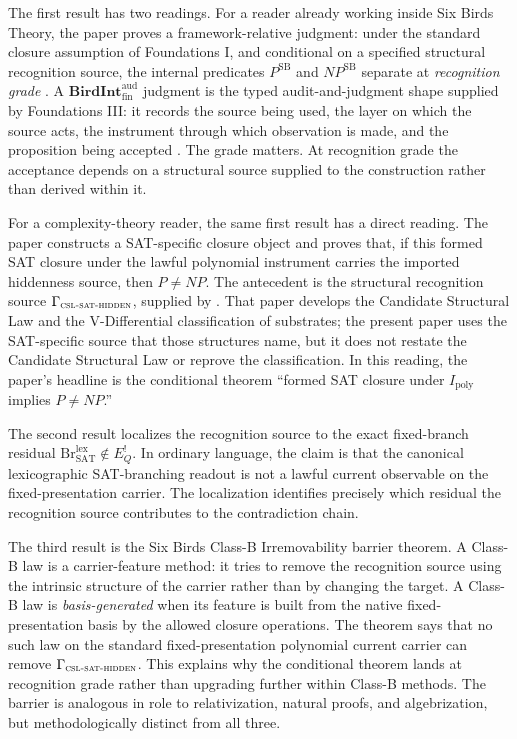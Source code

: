 \documentclass[11pt]{article}
\newcommand{\Ipoly}{I_{\mathrm{poly}}}
\newcommand{\EQbang}{E^{!}_{Q}}
\newcommand{\CSLSATHidden}{\Gamma_{\textsc{csl-sat-hidden}}}
\newcommand{\PSB}{P^{\mathrm{SB}}}
\newcommand{\NPSB}{NP^{\mathrm{SB}}}
\newcommand{\BirdInt}{\mathbf{BirdInt}^{\mathrm{aud}}_{\mathrm{fin}}}
\newcommand{\RecognitionGrade}{\emph{recognition grade}}
\newcommand{\CSLcore}{Candidate Structural Law}
\newcommand{\VDiff}{V-Differential classification}
\theoremstyle{definition}
\begin{document}
The first result has two readings.  For a reader already working inside
Six Birds Theory, the paper proves a framework-relative judgment: under
the standard closure assumption of Foundations I, and conditional on a
specified structural recognition source, the internal predicates
\(\PSB\) and \(\NPSB\) separate at \RecognitionGrade{}
\citep{TsiokosFoundationsI2026}.  A \(\BirdInt\) judgment is the typed
audit-and-judgment shape supplied by Foundations III: it records the
source being used, the layer on which the source acts, the instrument
through which observation is made, and the proposition being accepted
\citep{TsiokosFoundationsIII2026}.  The grade matters.  At recognition
grade the acceptance depends on a structural source supplied to the
construction rather than derived within it.

For a complexity-theory reader, the same first result has a direct
reading.  The paper constructs a SAT-specific closure object and proves
that, if this formed SAT closure under the lawful polynomial instrument
carries the imported hiddenness source, then \(P\neq NP\).  The
antecedent is the structural recognition source \(\CSLSATHidden\),
supplied by \citet{TsiokosHiddenness2026}.  That paper develops the
\CSLcore{} and the \VDiff{} of substrates; the present paper uses the
SAT-specific source that those structures name, but it does not restate
the Candidate Structural Law or reprove the classification.  In this
reading, the paper's headline is the conditional theorem ``formed SAT
closure under \(\Ipoly\) implies \(P\neq NP\).''

The second result localizes the recognition source to the exact
fixed-branch residual
\(\mathrm{Br}^{\mathrm{lex}}_{\mathrm{SAT}}\notin \EQbang\).  In
ordinary language, the claim is that the canonical lexicographic
SAT-branching readout is not a lawful current observable on the
fixed-presentation carrier.  The localization identifies precisely
which residual the recognition source contributes to the contradiction
chain.

The third result is the Six Birds Class-B Irremovability barrier
theorem.  A Class-B law is a carrier-feature method: it tries to remove
the recognition source using the intrinsic structure of the carrier
rather than by changing the target.  A Class-B law is \emph{basis-generated}
when its feature is built from the native fixed-presentation basis by
the allowed closure operations.  The theorem says that no such law on
the standard fixed-presentation polynomial current carrier can remove
\(\CSLSATHidden\).  This explains why the conditional theorem lands at
recognition grade rather than upgrading further within Class-B methods.
The barrier is analogous in role to relativization, natural proofs, and
algebrization, but methodologically distinct from all three.
\end{document}
